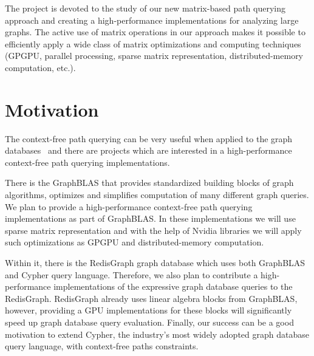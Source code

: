 \documentclass[12pt]{article}  %
\theoremstyle{remark}
\begin{document}
The project is devoted to the study of our new matrix-based path querying approach and creating a high-performance implementations for analyzing large graphs. The active use of matrix operations in our approach makes it possible to efficiently apply a wide class of matrix optimizations and computing techniques (GPGPU, parallel processing, sparse matrix representation, distributed-memory computation, etc.).

\section{Motivation}
The context-free path querying can be very useful when applied to the graph databases~\cite{kuijpers2019experimental} and there are projects which are interested in a high-performance context-free path querying implementations.

There is the GraphBLAS that provides standardized building blocks of graph algorithms, optimizes and simplifies computation of many different graph queries. 
We plan to provide a high-performance context-free path querying implementations as part of GraphBLAS. 
In these implementations we will use sparse matrix representation and with the help of Nvidia libraries we will apply such optimizations as GPGPU and distributed-memory computation.

Within it, there is the RedisGraph graph database which uses both GraphBLAS and Cypher query language. 
Therefore, we also plan to contribute a high-performance implementations of the expressive graph database queries to the RedisGraph. 
RedisGraph already uses linear algebra blocks from GraphBLAS, however, providing a GPU implementations for these blocks will significantly speed up graph database query evaluation.
Finally, our success can be a good motivation to extend Cypher, the industry’s most widely adopted graph database query language, with context-free paths constraints. 


\end{document}
